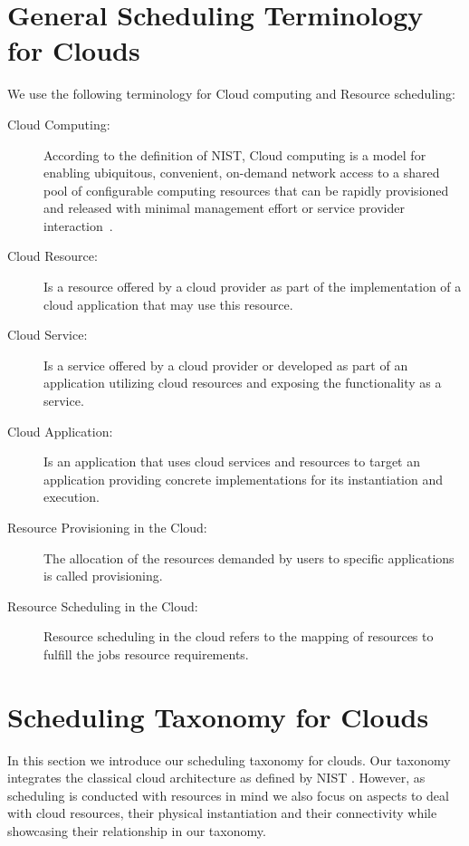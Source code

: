 \documentclass[final,5p,times,twocolumn]{elsarticle}
\begin{document}
\section{General Scheduling Terminology for Clouds}\label{sec:terminology}

We use the following terminology for Cloud computing and Resource scheduling:

\begin{description}

\item[Cloud Computing:] According to the definition of NIST, Cloud computing
  is a model for enabling ubiquitous, convenient, on-demand network
  access to a shared pool of configurable computing resources that can
  be rapidly provisioned and released with minimal management effort
  or service provider interaction~\cite{mell2011nist}.

\item[Cloud Resource:] Is a resource offered by a cloud provider as
  part of the implementation of a cloud application that may use this
  resource.

\item[Cloud Service:] Is a service offered by a cloud provider or
  developed as part of an application utilizing cloud resources and
  exposing the functionality as a service.
  
\item[Cloud Application:] Is an application that uses cloud services
  and resources to target an application providing concrete
  implementations for its instantiation and execution.

\item [Resource Provisioning in the Cloud:] The allocation of the
  resources demanded by users to specific
  applications is called provisioning. 
  
\item [Resource Scheduling in the Cloud:] Resource scheduling in the
  cloud refers to the mapping of resources to fulfill the jobs
  resource requirements.

\end{description}

\section{Scheduling Taxonomy for Clouds}\label{sec:taxonomy}


In this section we introduce our scheduling taxonomy for clouds. Our
taxonomy integrates the classical cloud architecture as defined by
NIST \cite{mell2011nist}. However, as scheduling is conducted with
resources in mind we also focus on aspects to deal with cloud
resources, their physical instantiation and their connectivity while
showcasing their relationship in our taxonomy.
\end{document}
